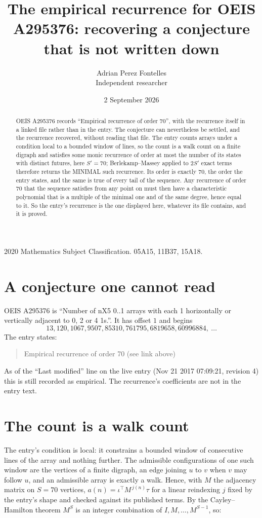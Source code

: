 \documentclass[11pt,a4paper]{article}
\title{The empirical recurrence for OEIS A295376: recovering a conjecture that is not written down}
\author{Adrian Perez Fontelles\\ \small Independent researcher}
\date{2 September 2026}
\theoremstyle{plain}
\theoremstyle{definition}
\begin{document}
\maketitle

\begin{abstract}
OEIS A295376 records ``Empirical recurrence of order $70$'', with the recurrence itself in a
linked file rather than in the entry. The conjecture can nevertheless be settled, and the
recurrence recovered, without reading that file. The entry counts arrays under a condition
local to a bounded window of lines, so the count is a walk count on a finite digraph and
satisfies some monic recurrence of order at most the number of its states with distinct
futures, here $S'=70$; Berlekamp--Massey applied to $2S'$ exact
terms therefore returns the MINIMAL such recurrence. Its order is exactly $70$, the order
the entry states, and the same is true of every tail of the sequence. Any recurrence of order
$70$ that the sequence satisfies from any point on must then have a characteristic
polynomial that is a multiple of the minimal one and of the same degree, hence equal to it. So
the entry's recurrence is the one displayed here, whatever its file contains, and it is
proved.
\end{abstract}

\noindent\small 2020 Mathematics Subject Classification. 05A15, 11B37, 15A18.\normalsize

\section{A conjecture one cannot read}

OEIS A295376 is ``Number of nX5 0..1 arrays with each 1 horizontally or vertically adjacent to 0, 2 or 4 1s.''. It has offset $1$ and begins
\[
13, 120, 1067, 9507, 85310, 761795, 6819658, 60996884,\ \dots
\]
The entry states:
\begin{quote}
Empirical recurrence of order 70 (see link above)
\end{quote}
As of the ``Last modified'' line on the live entry (Nov 21 2017 07:09:21, revision 4) this is still
recorded as empirical. The recurrence's coefficients are not in the entry text.

\section{The count is a walk count}

The entry's condition is local: it constrains a bounded window of consecutive lines of the
array and nothing further. The admissible configurations of one such window are the vertices
of a finite digraph, an edge joining $u$ to $v$ when $v$ may follow $u$, and an admissible
array is exactly a walk. Hence, with $M$ the adjacency matrix on $S=70$ vertices,
$a(n)=\iota^{\!\top}M^{\,j(n)}\tau$ for a linear reindexing $j$ fixed by the entry's shape
and checked against its published terms. By the Cayley--Hamilton theorem $M^{S}$ is an
integer combination of $I,M,\dots,M^{S-1}$, so:
\end{document}
